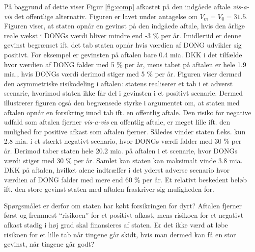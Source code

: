 \documentclass{article}
\begin{document}
På baggrund af dette viser Figur \ref{fig:comp} afkastet på den indgåede aftale \emph{vis-a-vis} det offentlige alternativ. Figuren er lavet under antagelse om  $V_m=V_0=31.5$. Figuren viser, at staten opnår en gevinst på den indgåede aftale, hvis den årlige reale vækst i DONGs værdi bliver mindre end -3 \% per år. Imidlertid er denne gevinst begrænset ift. det tab staten opnår hvis værdien af DONG udvikler sig positivt. For eksempel er gevinsten på aftalen bare 0.4 mia. DKK i det tilfælde hvor værdien af DONG falder med 5 \% per år, mens tabet på aftalen er hele 1.9 mia., hvis DONGs værdi derimod stiger med 5 \% per år. Figuren viser dermed den asymmetriske risikodeling i aftalen: statens realiserer et tab i et adverst scenarie, hvorimod staten ikke får del i gevinsten i et positivt scenarie. Dermed illustrerer figuren også den begrænsede styrke i argumentet om, at staten med aftalen opnår en forsikring imod tab ift. en offentlig aftale. Den risiko for negative udfald som aftalen fjerner \emph{vis-a-vis} en offentlig aftale, er meget lille ift. den mulighed for positive afkast som aftalen fjerner. Således vinder staten f.eks. kun 2.8 mia. i et stærkt negativt scenario, hvor DONGs værdi falder med 30 \% per år. Derimod taber staten hele 20.2 mia. på aftalen i et scenarie, hvor DONGs værdi stiger med 30 \% per år. Samlet kan staten kan maksimalt vinde 3.8 mia. DKK på aftalen, hvilket alene indtræffer i det yderst adverse scenario hvor værdien af DONG falder med mere end 60 \% per år. Et relativt beskedent beløb ift. den store gevinst staten med aftalen fraskriver sig muligheden for. 

Spørgsmålet er derfor om staten har købt forsikringen for dyrt? Aftalen fjerner først og fremmest \enquote{risikoen} for et positivt afkast, mens risikoen for et negativt afkast stadig i høj grad skal finansieres af staten. Er det ikke værd at løbe risikoen for et lille tab når tingene går skidt, hvis man dermed kan få en stor gevinst, når tingene går godt?
\end{document}
